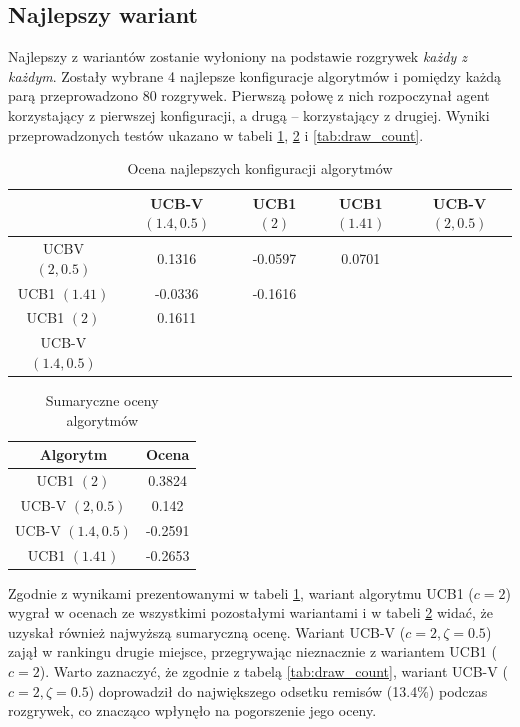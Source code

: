 \documentclass[a4paper,12pt]{article}
\begin{document}
\clearpage

\subsection{Najlepszy wariant} \label{subs:variant}
Najlepszy z wariantów zostanie wyłoniony na podstawie rozgrywek \textit{każdy z każdym}. Zostały wybrane 4 najlepsze konfiguracje algorytmów i pomiędzy każdą parą przeprowadzono 80 rozgrywek. Pierwszą połowę z nich rozpoczynał agent korzystający z pierwszej konfiguracji, a drugą -- korzystający z drugiej. Wyniki przeprowadzonych testów ukazano w tabeli \ref{tab:best_variant}, \ref{tab:best_variant_sum} i \ref{tab:draw_count}.

\begin{table}[!h]
	\centering
	\begin{tabular}{|c|c|c|c|c|} \hline
		& UCB-V $(1.4, 0.5)$ & UCB1 $(2)$ & UCB1 $(1.41)$ & UCB-V $(2, 0.5)$ \\ \hline
		UCBV $(2, 0.5)$ & 0.1316 & -0.0597 & 0.0701 & \cellcolor{lightgray} \\ \hline
		UCB1 $(1.41)$ & -0.0336 & -0.1616 & \cellcolor{lightgray} & \cellcolor{lightgray} \\ \hline
		UCB1 $(2)$ & 0.1611 & \cellcolor{lightgray} & \cellcolor{lightgray} & \cellcolor{lightgray}  \\ \hline
		UCB-V $(1.4, 0.5)$ & \cellcolor{lightgray} & \cellcolor{lightgray} & \cellcolor{lightgray} & \cellcolor{lightgray} \\ \hline
	\end{tabular}
	\caption{Ocena najlepszych konfiguracji algorytmów}
	\label{tab:best_variant}
\end{table}

\begin{table}[!h]
\centering
\begin{tabular}{|c|c|} \hline
	Algorytm & Ocena \\ \hline
	UCB1 $(2)$ & 0.3824 \\ \hline
	UCB-V $(2, 0.5)$ & 0.142 \\ \hline
	UCB-V $(1.4, 0.5)$ &	 -0.2591 \\ \hline
	UCB1 $(1.41)$ &	-0.2653 \\ \hline
\end{tabular}
\caption{Sumaryczne oceny algorytmów}
\label{tab:best_variant_sum}
\end{table}

Zgodnie z wynikami prezentowanymi w tabeli \ref{tab:best_variant}, wariant algorytmu UCB1 ($c=2$) wygrał w ocenach ze wszystkimi pozostałymi wariantami i w tabeli \ref{tab:best_variant_sum} widać, że uzyskał również najwyższą sumaryczną ocenę. Wariant UCB-V ($c=2, \zeta=0.5$) zajął w rankingu drugie miejsce, przegrywając nieznacznie z wariantem UCB1 ($c=2$). Warto zaznaczyć, że zgodnie z tabelą \ref{tab:draw_count}, wariant UCB-V ($c=2, \zeta=0.5$) doprowadził do największego odsetku remisów (13.4\%) podczas rozgrywek, co znacząco wpłynęło na pogorszenie jego oceny.
\end{document}
